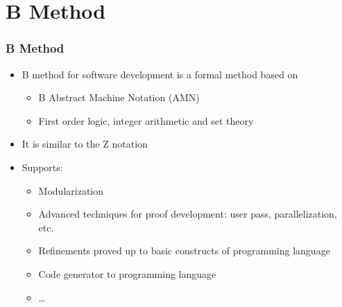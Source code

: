 \section{B Method}

\begin{frame}
\hypertarget{metodoB}{}
  \frametitle{B Method} 
  \begin{itemize}
    \item B method for software development is a formal method based on
	    \begin{itemize}
	    \item  B Abstract Machine Notation (AMN)
	    \item  First order logic, integer arithmetic and set theory
	    \end{itemize}
    \item It is similar to the Z notation
    \item Supports:
    \begin{itemize}
	    \item Modularization
	    \item Advanced techniques for proof development: user pass,
	    parallelization, etc.
	    \item Refinements proved up to basic constructs of programming language  
	    \item Code generator to programming language
	    \item \ldots
    \end{itemize}   
  \end{itemize}
\end{frame}
    

